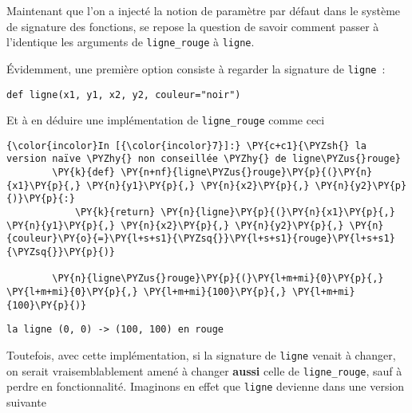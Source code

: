 Maintenant que l'on a injecté la notion de paramètre par défaut dans le
système de signature des fonctions, se repose la question de savoir
comment passer à l'identique les arguments de \texttt{ligne\_rouge} à
\texttt{ligne}.

    Évidemment, une première option consiste à regarder la signature de
\texttt{ligne}~:

\begin{verbatim}
def ligne(x1, y1, x2, y2, couleur="noir")
\end{verbatim}

    Et à en déduire une implémentation de \texttt{ligne\_rouge} comme ceci

    \begin{Verbatim}[commandchars=\\\{\},frame=single,framerule=0.3mm,rulecolor=\color{cellframecolor}]
{\color{incolor}In [{\color{incolor}7}]:} \PY{c+c1}{\PYZsh{} la version naïve \PYZhy{} non conseillée \PYZhy{} de ligne\PYZus{}rouge}
        \PY{k}{def} \PY{n+nf}{ligne\PYZus{}rouge}\PY{p}{(}\PY{n}{x1}\PY{p}{,} \PY{n}{y1}\PY{p}{,} \PY{n}{x2}\PY{p}{,} \PY{n}{y2}\PY{p}{)}\PY{p}{:}
            \PY{k}{return} \PY{n}{ligne}\PY{p}{(}\PY{n}{x1}\PY{p}{,} \PY{n}{y1}\PY{p}{,} \PY{n}{x2}\PY{p}{,} \PY{n}{y2}\PY{p}{,} \PY{n}{couleur}\PY{o}{=}\PY{l+s+s1}{\PYZsq{}}\PY{l+s+s1}{rouge}\PY{l+s+s1}{\PYZsq{}}\PY{p}{)}
        
        \PY{n}{ligne\PYZus{}rouge}\PY{p}{(}\PY{l+m+mi}{0}\PY{p}{,} \PY{l+m+mi}{0}\PY{p}{,} \PY{l+m+mi}{100}\PY{p}{,} \PY{l+m+mi}{100}\PY{p}{)}
\end{Verbatim}


    \begin{Verbatim}[commandchars=\\\{\},frame=single,framerule=0.3mm,rulecolor=\color{cellframecolor}]
la ligne (0, 0) -> (100, 100) en rouge
\end{Verbatim}

    Toutefois, avec cette implémentation, si la signature de \texttt{ligne}
venait à changer, on serait vraisemblablement amené à changer
\textbf{aussi} celle de \texttt{ligne\_rouge}, sauf à perdre en
fonctionnalité. Imaginons en effet que \texttt{ligne} devienne dans une
version suivante

